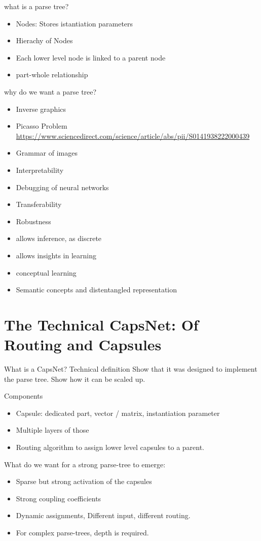 \documentclass{article}
\begin{document}
what is a parse tree?
\begin{itemize}
	\item Nodes: Stores istantiation parameters
	\item Hierachy of Nodes
	\item Each lower level node is linked to a parent node
	\item part-whole relationship
\end{itemize}
why do we want a parse tree?
\begin{itemize}
	\item Inverse graphics
	\item Picasso Problem \url{https://www.sciencedirect.com/science/article/abs/pii/S0141938222000439}
	\item Grammar of images
	\item Interpretability
	\item Debugging of neural networks
	\item Transferability
	\item Robustness
	\item allows inference, as discrete
	\item allows insights in learning
	\item conceptual learning
	\item Semantic concepts and distentangled representation
\end{itemize}

\section{The Technical CapsNet: Of Routing and Capsules}

What is a CapsNet? Technical definition
Show that it was designed to implement the parse tree.
Show how it can be scaled up.

Components
\begin{itemize}
	\item Capsule: dedicated part, vector / matrix, instantiation parameter
	\item Multiple layers of those
	\item Routing algorithm to assign lower level capsules to a parent.
\end{itemize}

What do we want for a strong parse-tree to emerge:
\begin{itemize}
	\item Sparse but strong activation of the capsules
	\item Strong coupling coefficients
	\item Dynamic assignments, Different input, different routing.
	\item For complex parse-trees, depth is required.
\end{itemize}
\end{document}
